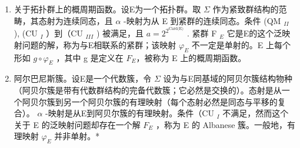 \begin{enumerate}
\def\labelenumi{\Roman{enumi}.}
\setcounter{enumi}{7}
\item
  关于拓扑群上的概周期函数。设E为一个拓扑群。取 \(\Sigma\) 作为紧致群结构的范畴，其态射为连续同态，且 \(\alpha\) -映射为从 E 到紧群的连续同态。条件 (QM \(_{II}\) ), (CU \(_{I}\) ）到（CU \(_{III}\) ) 被满足，且 \(a = 2^{2^{\text{Card(E)}}}\) . 紧群 F \(_{E}\) 它是E的这个泛映射问题的解，称为与E相联系的紧群；该映射 \(\varphi_{E}\) 不一定是单射的。E 上每个形如 \(g \circ \varphi_{E}\) ，其中 g 是定义在 \(F_E\)，被称为 E 上的概周期函数。
\item
  阿尔巴尼斯簇。设E是一个代数簇，令 \(\Sigma\) 设为与E同基域的阿贝尔簇结构物种（阿贝尔簇是带有代数群结构的完备代数簇；它必然是交换的）。态射是从一个阿贝尔簇到另一个阿贝尔簇的有理映射（每个态射必然是同态与平移的复合）。 \(\alpha\) -映射是从E到阿贝尔簇的有理映射。条件（CU \(_{I}\) 不满足，然而这个关于 E 的泛映射问题却存在一个解 \(F_{E}\) ，称为 E 的 Albanese 簇。一般地，有理映射 \(\varphi_{E}\) 并非单射。*
\end{enumerate}


